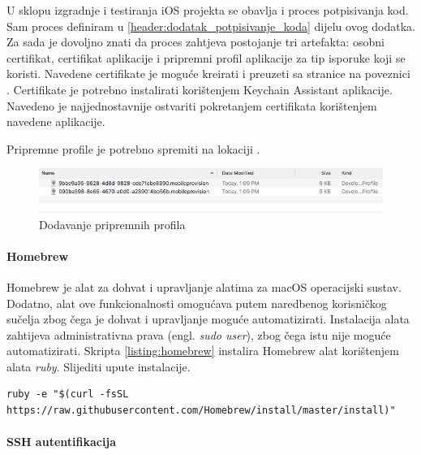 \documentclass[times, utf8, diplomski, numeric]{fer}
\newcommand{\eng}[1]{(engl. \textit{#1})}
\begin{document}
\begin{appendices}
U sklopu izgradnje i testiranja iOS projekta se obavlja i proces potpisivanja kod. Sam proces definiram u \ref{header:dodatak_potpisivanje_koda} dijelu ovog dodatka. Za sada je dovoljno znati da proces zahtjeva postojanje tri artefakta: osobni certifikat, certifikat aplikacije i pripremni profil aplikacije za tip isporuke koji se koristi. Navedene certifikate je moguće kreirati i preuzeti sa stranice na poveznici . Certifikate je potrebno instalirati korištenjem Keychain Assistant aplikacije. Navedeno je najjednostavnije ostvariti pokretanjem certifikata korištenjem navedene aplikacije.

Pripremne profile je potrebno spremiti na lokaciji .

\begin{figure}
\centering
\includegraphics[scale=0.4]{DodavanjePripravnihProfila}
\caption{Dodavanje pripremnih profila}
\label{fig:DodavanjePripravnihProfila}
\end{figure}

\paragraph{Homebrew}

Homebrew je alat za dohvat i upravljanje alatima za macOS operacijski sustav\citep{homebrew}. Dodatno, alat ove funkcionalnosti omogućava putem naredbenog korisničkog sučelja zbog čega je dohvat i upravljanje moguće automatizirati. Instalacija alata zahtijeva administrativna prava \eng{sudo user}, zbog čega istu nije moguće automatizirati. Skripta \ref{listing:homebrew} instalira Homebrew alat korištenjem alata \textit{ruby}. Slijediti upute instalacije.

\begin{lstlisting}[caption=Instalacija Homebrew alata, label=listing:homebrew]
ruby -e "$(curl -fsSL https://raw.githubusercontent.com/Homebrew/install/master/install)"
\end{lstlisting}

\paragraph{SSH autentifikacija}


\end{appendices}
\end{document}
